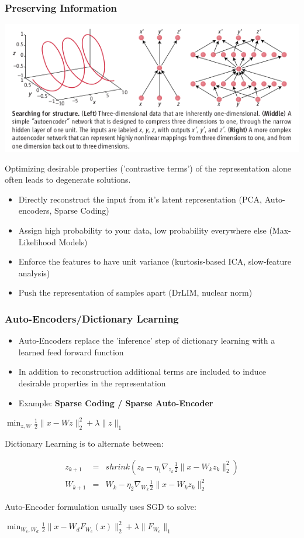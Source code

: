 \documentclass{beamer}
\begin{document}
\begin{frame}
\frametitle{Preserving Information} 
\centerline{\includegraphics[scale=0.3]{./images/DQE/autoenc.png}}
Optimizing desirable properties ('contrastive terms') of the representation alone often leads to degenerate solutions. 
\begin{itemize}
\item Directly reconstruct the input from it's latent representation (PCA, Auto-encoders, Sparse Coding) 
\item Assign high probability to your data, low probability everywhere else (Max-Likelihood Models) 
\item Enforce the features to have unit variance (kurtosis-based ICA, slow-feature analysis) 
\item Push the representation of samples apart (DrLIM, nuclear norm)   
\end{itemize} 
\end{frame} 

\begin{frame}
\frametitle{Auto-Encoders/Dictionary Learning} 
\begin{center} 
\begin{itemize} 
\item Auto-Encoders replace the 'inference' step of dictionary learning with a learned feed forward function 
\item In addition to reconstruction additional terms are included to induce desirable properties in the representation
\item Example: \textbf{Sparse Coding / Sparse Auto-Encoder} 
\end{itemize} 
$\min_{z, W} \frac{1}{2} \|x - W z \|_2 ^2 + \lambda \| z \|_1$\\
\begin{flushleft} Dictionary Learning is to alternate between:  \end{flushleft} 
\begin{eqnarray} 
z_{k+1} &=& shrink(z_k - \eta_1 \nabla_{z_k}\frac{1}{2} \|x - W_k z_k \|_2 ^2)\\
W_{k+1} &=& W_k - \eta_2 \nabla_{W_k}\frac{1}{2} \|x - W_k z_k \|_2 ^2
\end{eqnarray}
\begin{flushleft} Auto-Encoder formulation usually uses SGD to solve: \end{flushleft} 
$\min_{W_e, W_d} \frac{1}{2} \|x - W_d F_{W_e}(x) \|_2 ^2 + \lambda \| F_{W_e} \|_1$
\end{center} 
\end{frame} 
\end{document}
